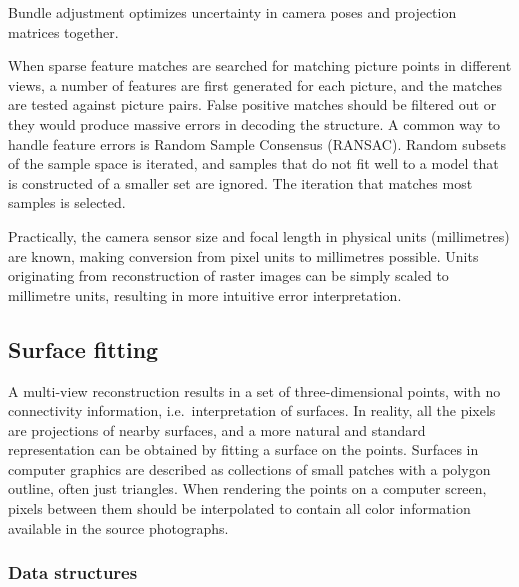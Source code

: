 Bundle adjustment optimizes uncertainty in camera poses and projection matrices together.

When sparse feature matches are searched for matching picture points in different views, a number of features are first generated for each picture, and the matches are tested against picture pairs.
False positive matches should be filtered out or they would produce massive errors in decoding the structure. \cite{jotainsiftausta}
A common way to handle feature errors is Random Sample Consensus (RANSAC).
Random subsets of the sample space is iterated, and samples that do not fit well to a model that is constructed of a smaller set are ignored.
The iteration that matches most samples is selected. \cite{hartley03multiview}


Practically, the camera sensor size and focal length in physical units (millimetres) are known, making conversion from pixel units to millimetres possible.
Units originating from reconstruction of raster images can be simply scaled to millimetre units, resulting in more intuitive error interpretation.




\subsection{Surface fitting} %

A multi-view reconstruction results in a set of three-dimensional points, with no connectivity information, i.e.\ interpretation of surfaces.
In reality, all the pixels are projections of nearby surfaces, and a more natural and standard representation can be obtained by fitting a surface on the points.
Surfaces in computer graphics are described as collections of small patches with a polygon outline, often just triangles.
When rendering the points on a computer screen, pixels between them should be interpolated to contain all color information available in the source photographs.

\subsubsection{Data structures} %


